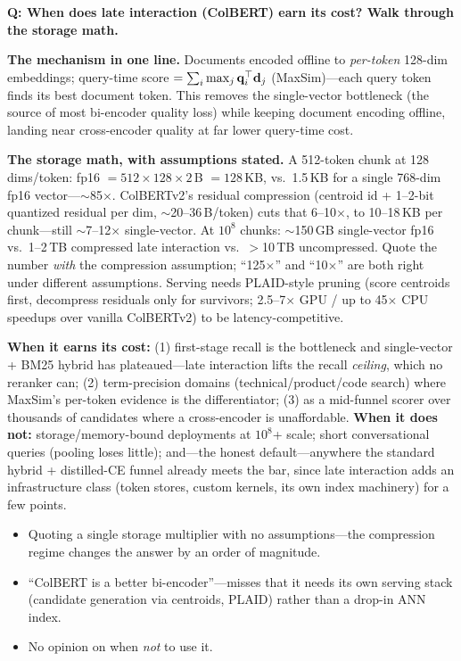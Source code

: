 \begin{interviewq}
\textbf{Q: When does late interaction (ColBERT) earn its cost? Walk through the storage math.}

 \quad {} \quad \badgefreq{\freqmed}

\stronganswer

\textbf{The mechanism in one line.} Documents encoded offline to \textit{per-token} 128-dim embeddings; query-time score $= \sum_i \max_j \mathbf{q}_i^\top \mathbf{d}_j$ (MaxSim)---each query token finds its best document token. This removes the single-vector bottleneck (the source of most bi-encoder quality loss) while keeping document encoding offline, landing near cross-encoder quality at far lower query-time cost.

\textbf{The storage math, with assumptions stated.} A 512-token chunk at 128 dims/token: fp16 $= 512 \times 128 \times 2$\,B $= 128$\,KB, vs.\ 1.5\,KB for a single 768-dim fp16 vector---$\sim$85$\times$. ColBERTv2's residual compression (centroid id + 1--2-bit quantized residual per dim, $\sim$20--36\,B/token) cuts that 6--10$\times$, to 10--18\,KB per chunk---still $\sim$7--12$\times$ single-vector. At $10^8$ chunks: $\sim$150\,GB single-vector fp16 vs.\ 1--2\,TB compressed late interaction vs.\ $>$10\,TB uncompressed. Quote the number \textit{with} the compression assumption; ``125$\times$'' and ``10$\times$'' are both right under different assumptions. Serving needs PLAID-style pruning (score centroids first, decompress residuals only for survivors; 2.5--7$\times$ GPU / up to 45$\times$ CPU speedups over vanilla ColBERTv2) to be latency-competitive.

\textbf{When it earns its cost:} (1) first-stage recall is the bottleneck and single-vector + BM25 hybrid has plateaued---late interaction lifts the recall \textit{ceiling}, which no reranker can; (2) term-precision domains (technical/product/code search) where MaxSim's per-token evidence is the differentiator; (3) as a mid-funnel scorer over thousands of candidates where a cross-encoder is unaffordable. \textbf{When it does not:} storage/memory-bound deployments at $10^8$+ scale; short conversational queries (pooling loses little); and---the honest default---anywhere the standard hybrid + distilled-CE funnel already meets the bar, since late interaction adds an infrastructure class (token stores, custom kernels, its own index machinery) for a few points.

\redflags
\begin{itemize}
    \item Quoting a single storage multiplier with no assumptions---the compression regime changes the answer by an order of magnitude.
    \item ``ColBERT is a better bi-encoder''---misses that it needs its own serving stack (candidate generation via centroids, PLAID) rather than a drop-in ANN index.
    \item No opinion on when \textit{not} to use it.
\end{itemize}


\end{interviewq}
